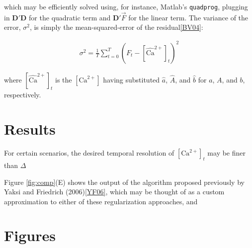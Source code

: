 \documentclass[12pt]{article}
\providecommand{\ve}[1]{\vec{#1}}
\providecommand{\ma}[1]{\boldsymbol{#1}}
\providecommand{\ve}[1]{\boldsymbol{#1}}
\newcommand{\Ca}{[\text{Ca}^{2+}]}
\newcommand{\Cae}{[\widehat{\text{Ca}}^{2+}]}
\begin{document}
\noindent which may be efficiently solved using, for instance, Matlab's \texttt{quadprog}, plugging in $\ma{D}'\ma{D}$ for the quadratic term and $\ma{D}'\ve{F}$ for the linear term. The variance of the error, $\sigma^2$, is simply the mean-squared-error of the residual\ref{BV04}:

\begin{align}
\sigma^2 = \frac{1}{T} \sum_{t=0}^T (F_t - \Cae_t)^2
\end{align}

\noindent where $\Cae_t$ is the $\Ca$ having substituted $\widehat{a}$, $\widehat{A}$, and $\widehat{b}$ for $a$, $A$, and $b$, respectively.

\section{Results} \label{sec:results}

For certain scenarios, the desired temporal resolution of $\Ca_t$ may be finer than $\Delta$

Figure \ref{fig:comp}(E) shows the output of the algorithm proposed previously by Yaksi and Friedrich (2006)\ref{YF06}, which may be thought of as a custom approximation to either of these regularization approaches, and










\clearpage
\section{Figures}
\end{document}
